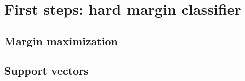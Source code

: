 \section {First steps: hard margin classifier}



\subsection {Margin maximization}
\subsection {Support vectors}